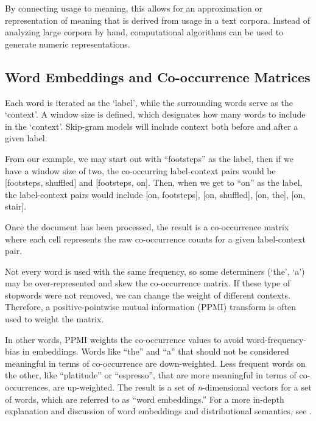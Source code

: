 By connecting usage to meaning, this allows for an approximation or representation of meaning that is derived from usage in a text corpora. Instead of analyzing large corpora by hand, computational algorithms can be used to generate numeric representations.

\subsection{Word Embeddings and Co-occurrence Matrices}

Each word is iterated as the `label', while the surrounding words serve as the `context'. A window size is defined, which designates how many words to include in the `context'. Skip-gram models will include context both before and after a given label.

From our example, we may start out with ``footsteps'' as the label, then if we have a window size of two, the co-occurring label-context pairs would be [footsteps, shuffled] and [footsteps, on].
Then, when we get to ``on'' as the label, the label-context pairs would include [on, footsteps], [on, shuffled], [on, the], [on, stair].

Once the document has been processed, the result is a co-occurrence matrix where each cell represents the raw co-occurrence counts for a given label-context pair.


Not every word is used with the same frequency, so some determiners (`the', `a') may be over-represented and skew the co-occurrence matrix. If these type of stopwords were not removed, we can change the weight of different contexts. Therefore, a positive-pointwise mutual information (PPMI) transform is often used to weight the matrix. 

In other words, PPMI weights the co-occurrence values to avoid word-frequency-bias in embeddings. Words like ``the'' and ``a'' that should not be considered meaningful in terms of co-occurrence are down-weighted. Less frequent words on the other, like ``platitude'' or ``espresso'', that are more meaningful in terms of co-occurrences, are up-weighted. The result is a set of \textit{n}-dimensional vectors for a set of words, which are referred to as ``word embeddings.'' For a more in-depth explanation and discussion of word embeddings and distributional semantics, see \cite{lenci2018distributional}.


